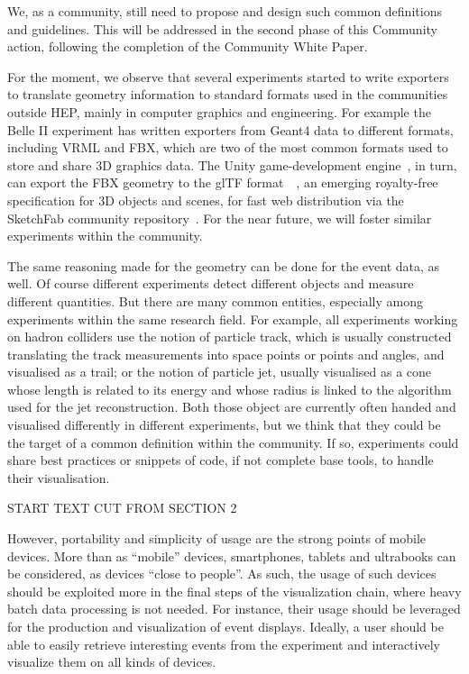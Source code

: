 \documentclass[12pt,a4paper]{article}
\begin{document}
We, as a community, still need to propose and design such common definitions and guidelines. This will
be addressed in the second phase of this Community action, following the completion of the Community White Paper.

For the moment, we observe that several experiments started to write exporters to translate geometry information to
standard formats used in the communities outside HEP, mainly in computer graphics and engineering. For example the Belle II
experiment has written exporters from Geant4 data to different formats, including VRML and FBX, which are two of the most common
formats used to store and share 3D graphics data. The Unity game-development engine~\cite{Unity3D}, in turn, can export the
FBX geometry to the glTF format~\cite{glTF}~\cite{glTF,SketchFabBelleII}, an emerging royalty-free specification for 3D objects and scenes,
for fast web distribution via the SketchFab community repository~\cite{SketchFab}. For the near future, we will foster similar
experiments within the community.

The same reasoning made for the geometry can be done for the event data, as well. Of course different experiments detect
different objects and measure different quantities. But there are many common entities, especially among experiments
within the same research field. For example, all experiments working on hadron colliders use the notion of particle track,
which is usually constructed translating the track measurements into space points or points and angles, and visualised as
a trail; or the notion of particle jet, usually visualised as a cone whose length is related to its energy and whose radius
is linked to the algorithm used for the jet reconstruction. Both those object are currently often handed and visualised
differently in different experiments, but we think that they could be the target of a common definition within the community.
If so, experiments could share best practices or snippets of code, if not complete base tools, to handle their visualisation.

START TEXT CUT FROM SECTION 2

However, portability and simplicity of usage are the strong points of mobile devices. More than as ``mobile'' devices, smartphones,
tablets and ultrabooks can be considered, as devices ``close to people''. As such, the usage of such devices
should be exploited more in the final steps of the visualization chain, where heavy batch data processing is not needed. For instance,
their usage should be leveraged for the production and visualization of event displays.
Ideally, a user should be able to easily retrieve interesting events from the experiment and interactively visualize them on all
kinds of devices.
\end{document}
